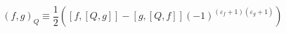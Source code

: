 \begin{equation}
(f,g)_{Q}\equiv\frac{1}{2}\left(  [f,[Q,g]]-[g,[Q,f]](-1)^{(\varepsilon
_{f}+1)(\varepsilon_{g}+1)}\right) \label{1.2}%
\end{equation}

